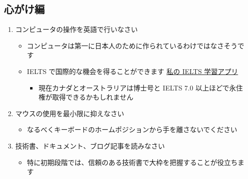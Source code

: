 \documentclass[a4paper,11pt,uplatex]{jsarticle}
\begin{document}
\subsection{心がけ編}
\begin{enumerate}
    \item コンピュータの操作を英語で行いなさい
    \begin{itemize}
        \item コンピュータは第一に日本人のために作られているわけではなさそうです
        \item IELTS で国際的な機会を得ることができます \href{https://ai-ielts.app/}{私の IELTS 学習アプリ}
        \begin{itemize}
            \item 現在カナダとオーストラリアは博士号と IELTS 7.0 以上ほどで永住権が取得できるかもしれません
        \end{itemize}
    \end{itemize}
    \item マウスの使用を最小限に抑えなさい
    \begin{itemize}
        \item なるべくキーボードのホームポジションから手を離さないでください
    \end{itemize}
    \item 技術書、ドキュメント、ブログ記事を読みなさい
    \begin{itemize}
        \item 特に初期段階では、信頼のある技術書で大枠を把握することが役立ちます
    \end{itemize}
\end{enumerate}
\end{document}
